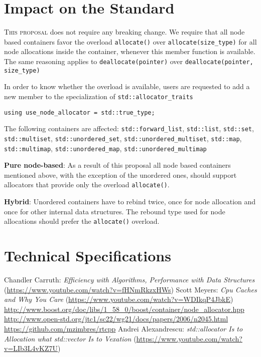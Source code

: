 \documentclass[11pt]{article}
\begin{document}
\section{Impact on the Standard}

\textsc{This proposal} does not require any breaking change. We require
that all node based containers favor the overload \texttt{allocate()}
over \texttt{allocate(size\_type)} for all node allocations inside the
container, whenever this member function is available. The same
reasoning applies to \texttt{deallocate(pointer)} over
\texttt{deallocate(pointer, size\_type)}

In order to know whether the overload is available, users are
requested to add a new member to the specialization of
\texttt{std::allocator\_traits}

\medskip
\begin{lstlisting}
using use_node_allocator = std::true_type;
\end{lstlisting}

The following containers are affected: \texttt{std::forward\_list},
\texttt{std::list}, \texttt{std::set}, \texttt{std::multiset},
\texttt{std::unordered\_set}, \texttt{std::unordered\_multiset},
\texttt{std::map}, \texttt{std::multimap},
\texttt{std::unordered\_map}, \texttt{std::unordered\_multimap}

\medskip
\noindent
{\bf Pure node-based}: As a result of this proposal all node based
containers mentioned above, with the exception of the unordered ones,
should support allocators that provide only the overload
\texttt{allocate()}.

\medskip
\noindent
{\bf Hybrid}: Unordered containers have to rebind twice, once
for node allocation and once for other internal data structures.
The rebound type used for node allocations should prefer the 
\texttt{allocate()} overload.

\section{Technical Specifications}

\begin{thebibliography}{9}

   Chandler Carruth: {\it Efficiency with Algorithms, Performance
  with Data Structures} (\url{https://www.youtube.com/watch?v=fHNmRkzxHWs})
   Scott Meyers: {\it Cpu Caches and Why You Care} (\url{https://www.youtube.com/watch?v=WDIkqP4JbkE})
   \url{http://www.boost.org/doc/libs/1_58_0/boost/container/node_allocator.hpp}
   \url{http://www.open-std.org/jtc1/sc22/wg21/docs/papers/2006/n2045.html}
   \url{https://github.com/mzimbres/rtcpp}
   Andrei Alexandrescu: {\it std::allocator Is to Allocation what
  std::vector Is to Vexation} (\url{https://www.youtube.com/watch?v=LIb3L4vKZ7U})

\end{thebibliography}
\end{document}

